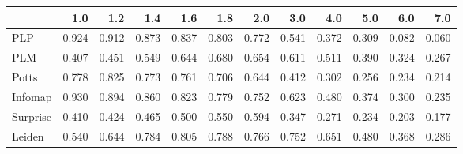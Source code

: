 \begin{tabular}{lrrrrrrrrrrr}
\toprule
{} &   1.0 &   1.2 &   1.4 &   1.6 &   1.8 &   2.0 &   3.0 &   4.0 &   5.0 &   6.0 &   7.0 \\
\midrule
PLP      & 0.924 & 0.912 & 0.873 & 0.837 & 0.803 & 0.772 & 0.541 & 0.372 & 0.309 & 0.082 & 0.060 \\
PLM      & 0.407 & 0.451 & 0.549 & 0.644 & 0.680 & 0.654 & 0.611 & 0.511 & 0.390 & 0.324 & 0.267 \\
Potts    & 0.778 & 0.825 & 0.773 & 0.761 & 0.706 & 0.644 & 0.412 & 0.302 & 0.256 & 0.234 & 0.214 \\
Infomap  & 0.930 & 0.894 & 0.860 & 0.823 & 0.779 & 0.752 & 0.623 & 0.480 & 0.374 & 0.300 & 0.235 \\
Surprise & 0.410 & 0.424 & 0.465 & 0.500 & 0.550 & 0.594 & 0.347 & 0.271 & 0.234 & 0.203 & 0.177 \\
Leiden   & 0.540 & 0.644 & 0.784 & 0.805 & 0.788 & 0.766 & 0.752 & 0.651 & 0.480 & 0.368 & 0.286 \\
\bottomrule
\end{tabular}
